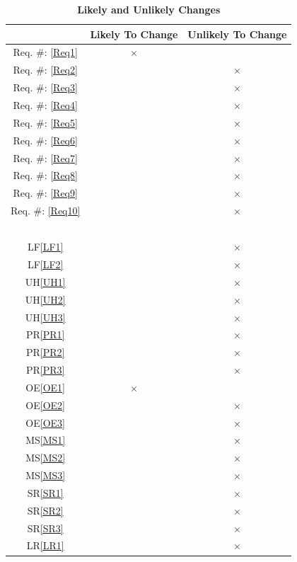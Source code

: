 \documentclass[12pt, titlepage]{article}
\newcommand{\reqref}[1]{Req. \#: \ref{#1}}
\begin{document}
\begin{table}[!h]
\centering
\begin{tabular}{|c|c|c|}
\hline
 & Likely To Change & Unlikely To Change\\
\hline
\reqref{Req1}& $\times$ & \\
\hline
\reqref{Req2}& & $\times$\\
\hline
\reqref{Req3}& & $\times$\\
\hline
\reqref{Req4}& & $\times$\\
\hline
\reqref{Req5}& & $\times$\\
\hline
\reqref{Req6}& & $\times$\\
\hline
\reqref{Req7}& & $\times$\\
\hline
\reqref{Req8}& & $\times$\\
\hline
\reqref{Req9}& & $\times$\\
\hline
\reqref{Req10}& & $\times$\\
\hline
\color{red}{\reqref{Req11}}& & \color{red}{$\times$}\\
\hline
\color{red}{\reqref{Req12}}& & \color{red}{$\times$}\\
\hline
\color{red}{\reqref{Req13}}& & \color{red}{$\times$}\\
\hline
\color{red}{\reqref{Req14}}& & \color{red}{$\times$}\\
\hline
\color{red}{\reqref{Req15}}& & \color{red}{$\times$}\\
\hline
LF\ref{LF1} & & $\times$\\
\hline
LF\ref{LF2}& & $\times$\\
\hline
UH\ref{UH1}& & $\times$\\
\hline
UH\ref{UH2}& & $\times$\\
\hline
UH\ref{UH3}& & $\times$\\
\hline
PR\ref{PR1}& & $\times$\\
\hline
PR\ref{PR2}& & $\times$\\
\hline
PR\ref{PR3}& & $\times$\\
\hline
OE\ref{OE1}& $\times$ & \\
\hline
OE\ref{OE2}& & $\times$\\
\hline
OE\ref{OE3}& & $\times$\\
\hline
MS\ref{MS1}& & $\times$\\
\hline
MS\ref{MS2}& & $\times$\\
\hline
MS\ref{MS3}& & $\times$\\
\hline
SR\ref{SR1}& & $\times$\\
\hline
SR\ref{SR2}& & $\times$\\
\hline
SR\ref{SR3}& & $\times$\\
\hline
LR\ref{LR1}& & $\times$\\
\hline
\end{tabular}
\caption{\bf Likely and Unlikely Changes}
\end{table}
\end{document}
